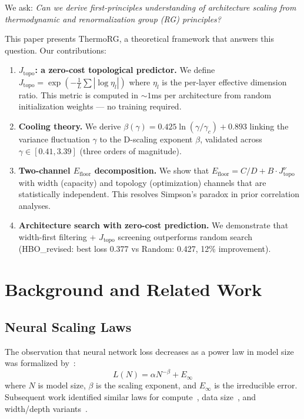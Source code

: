 \documentclass[11pt, a4paper]{article}
\theoremstyle{plain}
\begin{document}
We ask: \emph{Can we derive first-principles understanding of architecture scaling from thermodynamic and renormalization group (RG) principles?}

This paper presents ThermoRG, a theoretical framework that answers this question. Our contributions:

\begin{enumerate}
\item \textbf{$J_{\mathrm{topo}}$: a zero-cost topological predictor.} We define $J_{\mathrm{topo}} = \exp(-\frac{1}{L}\sum|\log\eta_l|)$ where $\eta_l$ is the per-layer effective dimension ratio. This metric is computed in $\sim 1$ms per architecture from random initialization weights --- no training required.

\item \textbf{Cooling theory.} We derive $\beta(\gamma) = 0.425\ln(\gamma/\gamma_c) + 0.893$ linking the variance fluctuation $\gamma$ to the D-scaling exponent $\beta$, validated across $\gamma \in [0.41, 3.39]$ (three orders of magnitude).

\item \textbf{Two-channel $E_{\mathrm{floor}}$ decomposition.} We show that $E_{\mathrm{floor}} = C/D + B\cdot J_{\mathrm{topo}}^\nu$ with width (capacity) and topology (optimization) channels that are statistically independent. This resolves Simpson's paradox in prior correlation analyses.

\item \textbf{Architecture search with zero-cost prediction.} We demonstrate that width-first filtering + $J_{\mathrm{topo}}$ screening outperforms random search (HBO\_revised: best loss 0.377 vs Random: 0.427, 12\% improvement).
\end{enumerate}

\section{Background and Related Work}

\subsection{Neural Scaling Laws}
The observation that neural network loss decreases as a power law in model size was formalized by~\citet{kaplan2020scaling}:
\begin{equation}
L(N) = \alpha N^{-\beta} + E_\infty
\end{equation}
where $N$ is model size, $\beta$ is the scaling exponent, and $E_\infty$ is the irreducible error. Subsequent work identified similar laws for compute~\citep{hoonisother2022}, data size~\citep{hoffmann2022training}, and width/depth variants~\citep{valentino2022scaling}.
\end{document}

